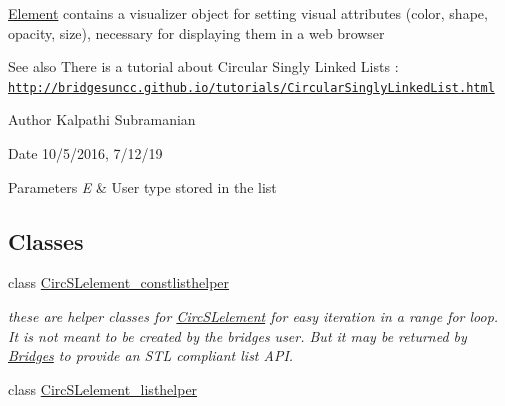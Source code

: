 \hyperlink{classbridges_1_1datastructure_1_1_element}{Element} contains a visualizer object for setting visual attributes (color, shape, opacity, size), necessary for displaying them in a web browser

\begin{DoxySeeAlso}{See also}
There is a tutorial about Circular Singly Linked Lists \+: \href{http://bridgesuncc.github.io/tutorials/CircularSinglyLinkedList.html}{\tt http\+://bridgesuncc.\+github.\+io/tutorials/\+Circular\+Singly\+Linked\+List.\+html}
\end{DoxySeeAlso}
\begin{DoxyAuthor}{Author}
Kalpathi Subramanian 
\end{DoxyAuthor}
\begin{DoxyDate}{Date}
10/5/2016, 7/12/19
\end{DoxyDate}

\begin{DoxyParams}{Parameters}
{\em E} & User type stored in the list \\
\hline
\end{DoxyParams}
\subsection*{Classes}
\begin{DoxyCompactItemize}
\item 
class \hyperlink{classbridges_1_1datastructure_1_1_circ_s_lelement_1_1_circ_s_lelement__constlisthelper}{Circ\+S\+Lelement\+\_\+constlisthelper}
\begin{DoxyCompactList}\small\item\em these are helper classes for \hyperlink{classbridges_1_1datastructure_1_1_circ_s_lelement}{Circ\+S\+Lelement} for easy iteration in a range for loop. It is not meant to be created by the bridges user. But it may be returned by \hyperlink{classbridges_1_1_bridges}{Bridges} to provide an S\+TL compliant list A\+PI. \end{DoxyCompactList}\item 
class \hyperlink{classbridges_1_1datastructure_1_1_circ_s_lelement_1_1_circ_s_lelement__listhelper}{Circ\+S\+Lelement\+\_\+listhelper}
\end{DoxyCompactItemize}
